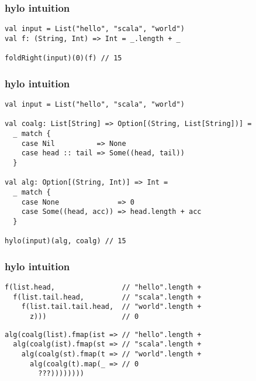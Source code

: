 \documentclass[include/preamble.tex]{subfiles}
\begin{document}
\begin{frame}[fragile]
  \frametitle{hylo intuition}
  \begin{center}
    \begin{lstlisting}[style=scala]
val input = List("hello", "scala", "world")
val f: (String, Int) => Int = _.length + _

foldRight(input)(0)(f) // 15
    \end{lstlisting}
  \end{center}
\end{frame}

\begin{frame}[fragile]
  \frametitle{hylo intuition}
  \begin{center}
    \begin{lstlisting}[style=scala]
val input = List("hello", "scala", "world")

val coalg: List[String] => Option[(String, List[String])] =
  _ match {
    case Nil          => None
    case head :: tail => Some((head, tail))
  }

val alg: Option[(String, Int)] => Int =
  _ match {
    case None              => 0
    case Some((head, acc)) => head.length + acc
  }

hylo(input)(alg, coalg) // 15
    \end{lstlisting}
  \end{center}
\end{frame}

\begin{frame}[fragile]
  \frametitle{hylo intuition}
  \begin{center}
    \begin{lstlisting}[style=scala]
f(list.head,                // "hello".length +
  f(list.tail.head,         // "scala".length +
    f(list.tail.tail.head,  // "world".length +
      z)))                  // 0
    \end{lstlisting}
    \begin{lstlisting}[style=scala]
alg(coalg(list).fmap(ist => // "hello".length +
  alg(coalg(ist).fmap(st => // "scala".length +
    alg(coalg(st).fmap(t => // "world".length +
      alg(coalg(t).map(_ => // 0
        ???))))))))
    \end{lstlisting}
  \end{center}
\end{frame}
\end{document}

